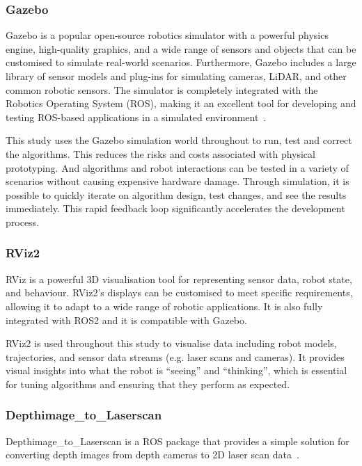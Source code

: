 \subsubsection{Gazebo}
Gazebo is a popular open-source robotics simulator with a powerful physics engine, high-quality graphics, 
and a wide range of sensors and objects that can be customised to simulate real-world scenarios. 
Furthermore, Gazebo includes a large library of sensor models and plug-ins for simulating cameras, LiDAR, 
and other common robotic sensors. The simulator is completely integrated with the Robotics Operating System (ROS), 
making it an excellent tool for developing and testing ROS-based applications in a simulated environment~\cite{gazebo}. 

This study uses the Gazebo simulation world throughout to run, test and correct the algorithms. 
This reduces the risks and costs associated with physical prototyping. 
And algorithms and robot interactions can be tested in a variety of scenarios without causing expensive hardware damage. 
Through simulation, it is possible to quickly iterate on algorithm design, test changes, and see the results immediately. 
This rapid feedback loop significantly accelerates the development process.
\subsubsection{RViz2}
RViz is a powerful 3D visualisation tool for representing sensor data, robot state, and behaviour.
RViz2's displays can be customised to meet specific requirements, 
allowing it to adapt to a wide range of robotic applications. 
It is also fully integrated with ROS2 and it is compatible with Gazebo. 

RViz2 is used throughout this study to visualise data including robot models, 
trajectories, and sensor data streams (e.g. laser scans and cameras). 
It provides visual insights into what the robot is ``seeing'' and ``thinking'', 
which is essential for tuning algorithms and ensuring that they perform as expected.
\subsubsection{Depthimage\_to\_Laserscan}
Depthimage\_to\_Laserscan is a ROS package that provides a simple solution for converting depth images from depth cameras to 2D laser scan data~\cite{rosdepthimage}. 

